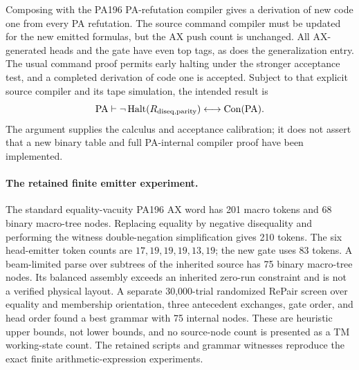 Composing with the PA196 PA-refutation compiler gives a derivation of
new code one from every PA refutation. The source command compiler must
be updated for the new emitted formulas, but the AX push count is
unchanged. All AX-generated heads and the gate have even top tags, as
does the generalization entry. The usual command proof permits early
halting under the stronger acceptance test, and a completed derivation
of code one is accepted. Subject to that explicit source compiler and
its tape simulation, the intended result is
\[
 \mathrm{PA}\vdash
 \neg\operatorname{Halt}(R_{\rm diseq,parity})
 \longleftrightarrow \operatorname{Con}(\mathrm{PA}).
\]
The argument supplies the calculus and acceptance calibration; it does
not assert that a new binary table and full PA-internal compiler proof
have been implemented.

\paragraph{The retained finite emitter experiment.}
The standard equality-vacuity PA196 AX word has 201 macro tokens and 68
binary macro-tree nodes. Replacing equality by negative disequality and
performing the witness double-negation simplification gives 210 tokens.
The six head-emitter token counts are $17,19,19,19,13,19$; the new gate
uses 83 tokens. A beam-limited parse over subtrees of the inherited
source has 75 binary macro-tree nodes. Its balanced assembly exceeds
an inherited zero-run constraint and is not a verified physical layout.
A separate 30,000-trial randomized RePair screen over equality and
membership orientation, three antecedent exchanges, gate order, and
head order found a best grammar with 75 internal nodes. These are
heuristic upper bounds, not lower bounds, and no source-node count is
presented as a TM working-state count. The retained scripts and grammar
witnesses reproduce the exact finite arithmetic-expression experiments.
